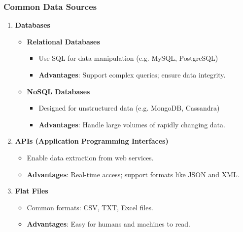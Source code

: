 \documentclass[aspectratio=169]{beamer}
\begin{document}
\begin{frame}[fragile]
    \frametitle{Common Data Sources}
    \begin{enumerate}
        \item \textbf{Databases}
            \begin{itemize}
                \item \textbf{Relational Databases}
                    \begin{itemize}
                        \item Use SQL for data manipulation (e.g. MySQL, PostgreSQL)
                        \item \textbf{Advantages}: Support complex queries; ensure data integrity.
                    \end{itemize}
                \item \textbf{NoSQL Databases}
                    \begin{itemize}
                        \item Designed for unstructured data (e.g. MongoDB, Cassandra)
                        \item \textbf{Advantages}: Handle large volumes of rapidly changing data.
                    \end{itemize}
            \end{itemize}
        \item \textbf{APIs (Application Programming Interfaces)}
            \begin{itemize}
                \item Enable data extraction from web services.
                \item \textbf{Advantages}: Real-time access; support formats like JSON and XML.
            \end{itemize}
        \item \textbf{Flat Files}
            \begin{itemize}
                \item Common formats: CSV, TXT, Excel files.
                \item \textbf{Advantages}: Easy for humans and machines to read.
            \end{itemize}
    \end{enumerate}
\end{frame}
\end{document}

